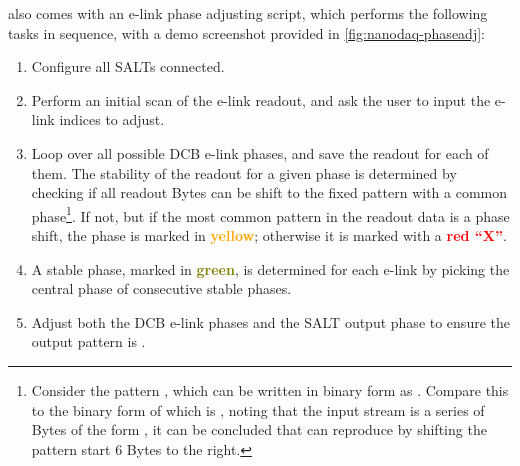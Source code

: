 \nanoDAQ also comes with an e-link phase adjusting script, which performs the
following tasks in sequence,
with a demo screenshot provided in \cref{fig:nanodaq-phaseadj}:

\begin{enumerate}
    \item Configure all SALTs connected.

    \item Perform an initial scan of the e-link readout,
        and ask the user to input the e-link indices to adjust.

    \item Loop over all possible DCB e-link phases, and save the readout for
        each of them.
        The stability of the readout for a given phase is determined by checking
        if all readout Bytes can be shift to the fixed pattern
         with a common phase\footnote{
            Consider the pattern , which can be written in binary
            form as .
            Compare this to the binary form of  which is
            ,
            noting that the input stream is a series of Bytes of the form
            ,
            it can be concluded that  can reproduce 
            by shifting the pattern start 6 Bytes to the right.
        }.
        If not, but if the most common pattern in the readout data is a phase
        shift,
        the phase is marked in \textcolor{orange}{\bfseries yellow};
        otherwise it is marked with a \textcolor{red}{\bfseries red ``X''}.

    \item A stable phase,
        marked in \textcolor{olive}{\bfseries green},
        is determined for each e-link by picking
        the central phase of consecutive stable phases.

    \item Adjust both the DCB e-link phases and the SALT output phase
        to ensure the output pattern is .
\end{enumerate}

